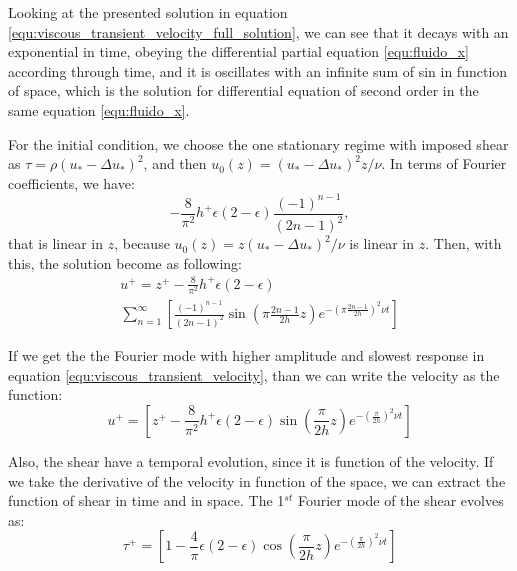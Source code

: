     Looking at the presented solution in equation \ref{equ:viscous_transient_velocity_full_solution}, we can see that it decays with an exponential in time, obeying the differential partial equation \ref{equ:fluido_x} according through time, and it is oscillates with an infinite sum of sin in function of space, which is the solution for differential equation of second order in the same equation \ref{equ:fluido_x}.

    For the initial condition, we choose the one stationary regime with imposed shear as $\tau = \rho {\left(u_*-\Delta u_*\right)}^2$, and then $u_0(z)=(u_*-\Delta u_*)^2 z/\nu$. In terms of Fourier coefficients, we have:
    \begin{equation}
        -\frac{8}{\pi^2}h^+ \epsilon\left(2-\epsilon\right)\frac{\left(-1\right)^{n-1}}{\left(2n-1\right)^2},
    \end{equation}
that is linear in $z$, because $u_0(z) = z(u_*-\Delta u_*)^2/\nu$ is linear in $z$. Then, with this, the solution become as following:
\begin{equation}
    \begin{split}
        u^+ = z^+ -\frac{8}{\pi^2}h^+\epsilon\left(2-\epsilon\right)\\
        \sum_{n=1}^\infty\left[
        {\frac{\left(-1\right)^{n-1}}{\left(2n-1\right)^2}}
        {\sin\left(\pi\frac{2n-1}{2h}z\right)}
        {e^{-{\left(\pi\frac{2n-1}{2h}\right)}^2\nu t}}
        \right]
    \end{split}
    \label{equ:viscous_transient_velocity}
\end{equation}

    If we get the the Fourier mode with higher amplitude and slowest response in equation \ref{equ:viscous_transient_velocity}, than we can write the velocity as the function:
    \begin{equation}
        u^+ = \left[z^+ -\frac{8}{\pi^2}h^+\epsilon\left(2-\epsilon\right)\sin\left(\frac{\pi}{2h}z\right)e^{-{\left(\frac{\pi}{2h}\right)}^2\nu t}\right]
        \label{equ:viscous_transient_velocity1}
    \end{equation}

    Also, the shear have a temporal evolution, since it is function of the velocity. If we take the derivative of the velocity in function of the space, we can extract the function of shear in time and in space. The 1$^{st}$ Fourier mode of the shear evolves as:
    \begin{equation}
        \tau^+ = \left[1 -\frac{4}{\pi}\epsilon\left(2-\epsilon\right)\cos\left(\frac{\pi}{2h}z\right)e^{-{\left(\frac{\pi}{2h}\right)}^2\nu t}\right]
        \label{equ:viscous_transient_shear1}
    \end{equation}

